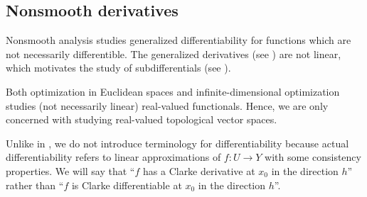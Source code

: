\subsection{Nonsmooth derivatives}\label{subsec:nonsmooth_derivatives}

\begin{remark}\label{rem:nonsmooth_analysis}
  Nonsmooth analysis studies generalized differentiability for functions which are not necessarily differentible. The generalized derivatives (see ) are not linear, which motivates the study of subdifferentials (see ).

  Both optimization in Euclidean spaces and infinite-dimensional optimization studies (not necessarily linear) real-valued functionals. Hence, we are only concerned with studying real-valued topological vector spaces.
\end{remark}

\begin{remark}\label{rem:nonsmooth_differentiability}
  Unlike in , we do not introduce terminology for differentiability because actual differentiability refers to linear approximations of \( f: U \to Y \) with some consistency properties. We will say that \enquote{\( f \) has a Clarke derivative at \( x_0 \) in the direction \( h \)} rather than \enquote{\( f \) is Clarke differentiable at \( x_0 \) in the direction \( h \)}.
\end{remark}

